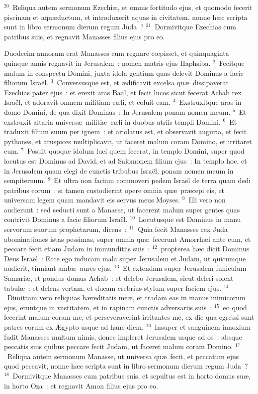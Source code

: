 ${}^{20}$~Reliqua autem sermonum Ezechi\ae , et omnis fortitudo ejus, et quomodo fecerit piscinam et aqu\ae ductum, et introduxerit aquas in civitatem, nonne h\ae c scripta sunt in libro sermonum dierum regum Juda~?
${}^{21}$~Dormivitque Ezechias cum patribus suis, et regnavit Manasses filius ejus pro eo.

\lettrine[lines=10,image=true,loversize=0.05,lraise=-0.03]{D}{}uodecim annorum erat Manasses cum regnare cœpisset, et quinquaginta quinque annis regnavit in Jerusalem~: nomen matris ejus Haphsiba.
${}^{2}$~Fecitque malum in conspectu Domini, juxta idola gentium quas delevit Dominus a facie filiorum Isra\"el.
${}^{3}$~Conversusque est, et \ae dificavit excelsa qu\ae\ dissipaverat Ezechias pater ejus~: et erexit aras Baal, et fecit lucos sicut fecerat Achab rex Isra\"el, et adoravit omnem militiam c\ae li, et coluit eam.
${}^{4}$~Exstruxitque aras in domo Domini, de qua dixit Dominus~: In Jerusalem ponam nomen meum.
${}^{5}$~Et exstruxit altaria univers\ae\ militi\ae\ c\ae li in duobus atriis templi Domini.
${}^{6}$~Et traduxit filium suum per ignem~: et ariolatus est, et observavit auguria, et fecit pythones, et aruspices multiplicavit, ut faceret malum coram Domino, et irritaret eum.
${}^{7}$~Posuit quoque idolum luci quem fecerat, in templo Domini, super quod locutus est Dominus ad David, et ad Salomonem filium ejus~: In templo hoc, et in Jerusalem quam elegi de cunctis tribubus Isra\"el, ponam nomen meum in sempiternum.
${}^{8}$~Et ultra non faciam commoveri pedem Isra\"el de terra quam dedi patribus eorum~: si tamen custodierint opere omnia qu\ae\ pr\ae cepi eis, et universam legem quam mandavit eis servus meus Moyses.
${}^{9}$~Illi vero non audierunt~: sed seducti sunt a Manasse, ut facerent malum super gentes quas contrivit Dominus a facie filiorum Isra\"el.
${}^{10}$~Locutusque est Dominus in manu servorum suorum prophetarum, dicens~:
${}^{11}$~Quia fecit Manasses rex Juda abominationes istas pessimas, super omnia qu\ae\ fecerunt Amorrh\ae i ante eum, et peccare fecit etiam Judam in immunditiis suis~:
${}^{12}$~propterea h\ae c dicit Dominus Deus Isra\"el~: Ecce ego inducam mala super Jerusalem et Judam, ut quicumque audierit, tinniant amb\ae\ aures ejus.
${}^{13}$~Et extendam super Jerusalem funiculum Samari\ae , et pondus domus Achab~: et delebo Jerusalem, sicut deleri solent tabul\ae~: et delens vertam, et ducam crebrius stylum super faciem ejus.
${}^{14}$~Dimittam vero reliquias h\ae reditatis me\ae , et tradam eas in manus inimicorum ejus, eruntque in vastitatem, et in rapinam cunctis adversariis suis~:
${}^{15}$~eo quod fecerint malum coram me, et perseveraverint irritantes me, ex die qua egressi sunt patres eorum ex \AE gypto usque ad hanc diem.
${}^{16}$~Insuper et sanguinem innoxium fudit Manasses multum nimis, donec impleret Jerusalem usque ad os~: absque peccatis suis quibus peccare fecit Judam, ut faceret malum coram Domino.
${}^{17}$~Reliqua autem sermonum Manasse, ut universa qu\ae\ fecit, et peccatum ejus quod peccavit, nonne h\ae c scripta sunt in libro sermonum dierum regum Juda~?
${}^{18}$~Dormivitque Manasses cum patribus suis, et sepultus est in horto domus su\ae , in horto Oza~: et regnavit Amon filius ejus pro eo.


